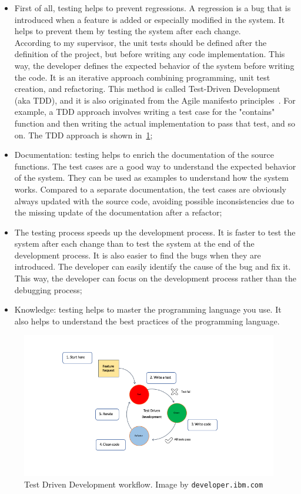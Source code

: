 \begin{itemize}
  \item
        First of all, testing helps to prevent regressions. A regression is a bug that is introduced when a feature is added or especially modified in the system. It helps to prevent them by testing the system after each change. \\
        According to my supervisor, the unit tests should be defined after the definition of the project, but before writing any code implementation. This way, the developer defines the expected behavior of the system before writing the code. It is an iterative approach combining programming, unit test creation, and refactoring. This method is called Test-Driven Development (aka TDD), and it is also originated from the Agile manifesto principles~\cite{agile-test-driven-development}. For example, a TDD approach involves writing a test case for the "contains" function and then writing the actual implementation to pass that test, and so on. The TDD approach is shown in~\cref{fig:tdd};
  \item
        Documentation: testing helps to enrich the documentation of the source functions. The test cases are a good way to understand the expected behavior of the system. They can be used as examples to understand how the system works. Compared to a separate documentation, the test cases are obviously always updated with the source code, avoiding possible inconsistencies due to the missing update of the documentation after a refactor;
  \item
        The testing process speeds up the development process. It is faster to test the system after each change than to test the system at the end of the development process. It is also easier to find the bugs when they are introduced. The developer can easily identify the cause of the bug and fix it. This way, the developer can focus on the development process rather than the debugging process;
  \item
        Knowledge: testing helps to master the programming language you use. It also helps to understand the best practices of the programming language.
\end{itemize}

\begin{figure}[h]
  \centering
  \includegraphics[width=1.0\textwidth]{chapters/06/assets/tdd}
  \caption[Test Driven Development workflow]{Test Driven Development workflow. Image by \texttt{developer.ibm.com}}
  \label{fig:tdd}
\end{figure}

